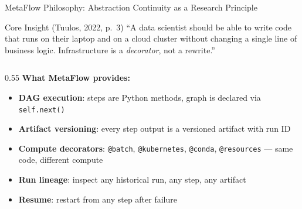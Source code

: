 \documentclass[10pt,aspectratio=169]{beamer}
\newcommand{\Key}[1]{\textcolor{mfblue}{\textbf{#1}}}
\begin{document}
\begin{frame}{MetaFlow Philosophy: Abstraction Continuity as a Research Principle}

\begin{block}{Core Insight (Tuulos, 2022, p.\ 3)}
\small ``A data scientist should be able to write code that runs on their laptop
and on a cloud cluster without changing a single line of business logic.
Infrastructure is a \emph{decorator}, not a rewrite.''
\end{block}

\begin{columns}
\begin{column}{0.55\textwidth}
\small
\textbf{What MetaFlow provides:}
\begin{itemize}
  \item \Key{DAG execution}: steps are Python methods, graph is declared via \texttt{self.next()}
  \item \Key{Artifact versioning}: every step output is a versioned artifact with run ID
  \item \Key{Compute decorators}: \texttt{@batch}, \texttt{@kubernetes}, \texttt{@conda}, \texttt{@resources} --- same code, different compute
  \item \Key{Run lineage}: inspect any historical run, any step, any artifact
  \item \Key{Resume}: restart from any step after failure
\end{itemize}


\end{column}
\end{columns}
\end{frame}
\end{document}
